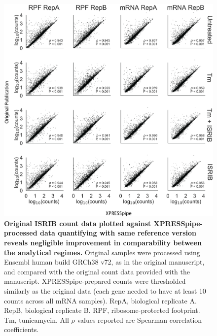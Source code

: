 \documentclass[10pt, oneside]{article}
\begin{document}
\begin{figure}
\centering
  \includegraphics[width=180mm]{figures/xpresspipe_supplement5.png}
  \caption{\textbf{Original ISRIB count data plotted against XPRESSpipe-processed data quantifying with same reference version reveals negligible improvement in comparability between the analytical regimes.} Original samples were processed using Ensembl human build GRCh38 v72, as in the original manuscript, and compared with the original count data provided with the manuscript. XPRESSpipe-prepared counts were thresholded similarly as the original data (each gene needed to have at least 10 counts across all mRNA samples). RepA, biological replicate A. RepB, biological replicate B. RPF, ribosome-protected footprint. Tm, tunicamycin. All $\rho$ values reported are Spearman correlation coefficients.}
  \label{fig:supplement5}
\end{figure}
\end{document}
